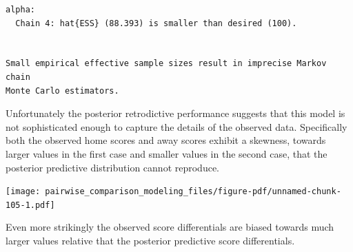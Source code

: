 \documentclass[
  letterpaper,
  DIV=11,
  numbers=noendperiod]{scrartcl}
\newenvironment{Shaded}{\begin{snugshade}}{\end{snugshade}}
\newcommand{\AttributeTok}[1]{\textcolor[rgb]{0.40,0.45,0.13}{#1}}
\newcommand{\DecValTok}[1]{\textcolor[rgb]{0.68,0.00,0.00}{#1}}
\newcommand{\FunctionTok}[1]{\textcolor[rgb]{0.28,0.35,0.67}{#1}}
\newcommand{\NormalTok}[1]{\textcolor[rgb]{0.00,0.23,0.31}{#1}}
\newcommand{\SpecialCharTok}[1]{\textcolor[rgb]{0.37,0.37,0.37}{#1}}
\newcommand{\StringTok}[1]{\textcolor[rgb]{0.13,0.47,0.30}{#1}}
\begin{document}
\begin{verbatim}
alpha:
  Chain 4: hat{ESS} (88.393) is smaller than desired (100).


Small empirical effective sample sizes result in imprecise Markov chain
Monte Carlo estimators.
\end{verbatim}

Unfortunately the posterior retrodictive performance suggests that this
model is not sophisticated enough to capture the details of the observed
data. Specifically both the observed home scores and away scores exhibit
a skewness, towards larger values in the first case and smaller values
in the second case, that the posterior predictive distribution cannot
reproduce.

\begin{Shaded}
\end{Shaded}

\texttt{[image: pairwise\_comparison\_modeling\_files/figure-pdf/unnamed-chunk-105-1.pdf]}

Even more strikingly the observed score differentials are biased towards
much larger values relative that the posterior predictive score
differentials.
\end{document}
